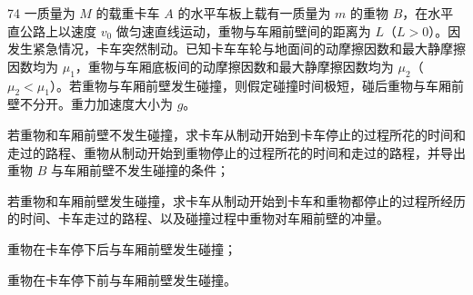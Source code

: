 \begin{problem}[第34届物理竞赛复赛][卡车与重物]{74}
    一质量为 $M$ 的载重卡车 $A$ 的水平车板上载有一质量为 $m$ 的重物 $B$，在水平直公路上以速度 $v_{0}$ 做匀速直线运动，重物与车厢前壁间的距离为 $L$（$L > 0$）。因发生紧急情况，卡车突然制动。已知卡车车轮与地面间的动摩擦因数和最大静摩擦因数均为 $\mu_{1}$，重物与车厢底板间的动摩擦因数和最大静摩擦因数均为 $\mu_{2}$（$\mu_{2} < \mu_{1}$）。若重物与车厢前壁发生碰撞，则假定碰撞时间极短，碰后重物与车厢前壁不分开。重力加速度大小为 $g$。
    \begin{subproblem}
        若重物和车厢前壁不发生碰撞，求卡车从制动开始到卡车停止的过程所花的时间和走过的路程、重物从制动开始到重物停止的过程所花的时间和走过的路程，并导出重物 $B$ 与车厢前壁不发生碰撞的条件；
    \end{subproblem}
    \begin{subproblem}
        若重物和车厢前壁发生碰撞，求卡车从制动开始到卡车和重物都停止的过程所经历的时间、卡车走过的路程、以及碰撞过程中重物对车厢前壁的冲量。
        \begin{subsubproblem}
            重物在卡车停下后与车厢前壁发生碰撞；
        \end{subsubproblem}
        \begin{subsubproblem}
            重物在卡车停下前与车厢前壁发生碰撞。
        \end{subsubproblem}
    \end{subproblem}
\end{problem}